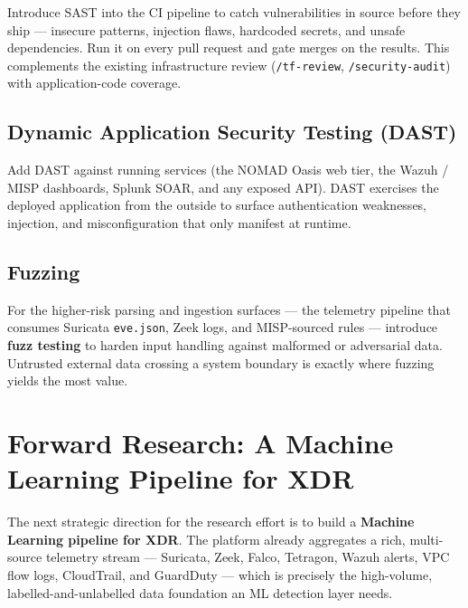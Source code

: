 \documentclass[11pt,a4paper]{report}
\begin{document}
Introduce SAST into the CI pipeline to catch vulnerabilities in source before
they ship — insecure patterns, injection flaws, hardcoded secrets, and unsafe
dependencies. Run it on every pull request and gate merges on the results. This
complements the existing infrastructure review (\texttt{/tf-review},
\texttt{/security-audit}) with application-code coverage.

\section{Dynamic Application Security Testing (DAST)}

Add DAST against running services (the NOMAD Oasis web tier, the Wazuh / MISP
dashboards, Splunk SOAR, and any exposed API). DAST exercises the deployed
application from the outside to surface authentication weaknesses, injection,
and misconfiguration that only manifest at runtime.

\section{Fuzzing}

For the higher-risk parsing and ingestion surfaces — the telemetry pipeline that
consumes Suricata \texttt{eve.json}, Zeek logs, and MISP-sourced rules — introduce
\textbf{fuzz testing} to harden input handling against malformed or adversarial
data. Untrusted external data crossing a system boundary is exactly where
fuzzing yields the most value.

\noindent{}

\chapter{Forward Research: A Machine Learning Pipeline for XDR}

The next strategic direction for the research effort is to build a
\textbf{Machine Learning pipeline for XDR}. The platform already aggregates a
rich, multi-source telemetry stream — Suricata, Zeek, Falco, Tetragon, Wazuh
alerts, VPC flow logs, CloudTrail, and GuardDuty — which is precisely the
high-volume, labelled-and-unlabelled data foundation an ML detection layer needs.
\end{document}
